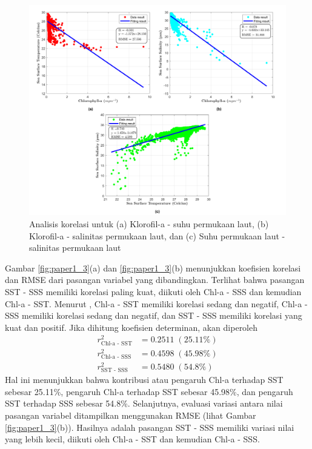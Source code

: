 \begin{spacing}{1.5}
	\begin{figure}[H]
		\centering
		\includegraphics[width=15cm]{contents/final_figure_paper1/gambar_2}
		\caption{Analisis korelasi untuk (a) Klorofil-a - suhu permukaan laut, (b) Klorofil-a - salinitas permukaan laut, dan (c) Suhu permukaan laut - salinitas permukaan laut}
		\label{fig:paper1_2}
	\end{figure}
	
	Gambar \ref{fig:paper1_3}(a) dan \ref{fig:paper1_3}(b) menunjukkan koefisien korelasi dan RMSE dari pasangan variabel yang dibandingkan. Terlihat bahwa pasangan SST - SSS memiliki korelasi paling kuat, diikuti oleh Chl-a - SSS dan kemudian Chl-a - SST. Menurut , Chl-a - SST memiliki korelasi sedang dan negatif, Chl-a - SSS memiliki korelasi sedang dan negatif, dan SST - SSS memiliki korelasi yang kuat dan positif. Jika dihitung koefisien determinan, akan diperoleh
	\begin{equation*}
		\begin{aligned}
			r^2_\text{Chl-a - SST}&=0.2511 \;(25.11\%) \\
			r^2_\text{Chl-a - SSS}&=0.4598 \;(45.98\%) \\
			r^2_\text{SST - SSS}&=0.5480 \;(54.8\%) 
		\end{aligned}	
	\end{equation*} 
	Hal ini menunjukkan bahwa kontribusi atau pengaruh Chl-a terhadap SST sebesar 25.11\%, pengaruh Chl-a terhadap SST sebesar 45.98\%, dan pengaruh SST terhadap SSS sebesar 54.8\%. Selanjutnya, evaluasi variasi antara nilai pasangan variabel ditampilkan menggunakan RMSE (lihat Gambar \ref{fig:paper1_3}(b)). Hasilnya adalah pasangan SST - SSS memiliki variasi nilai yang lebih kecil, diikuti oleh Chl-a - SST dan kemudian Chl-a - SSS.
	

\end{spacing}
